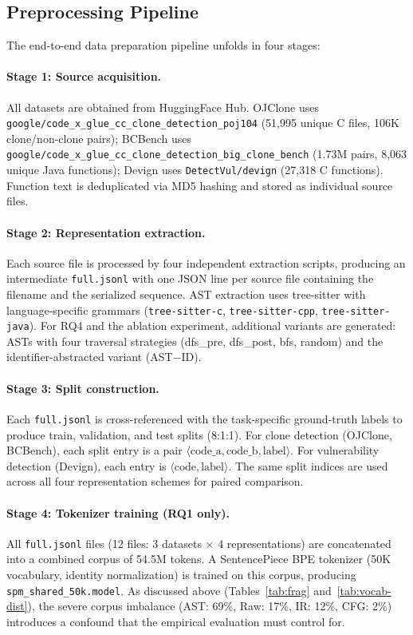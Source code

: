 \documentclass[pdflatex,sn-mathphys,Numbered]{sn-jnl}
\begin{document}
\subsection{Preprocessing Pipeline}

The end-to-end data preparation pipeline unfolds in four stages:

\paragraph{Stage 1: Source acquisition.} All datasets are obtained from HuggingFace Hub. OJClone uses \texttt{google/code\_x\_glue\_cc\_clone\_detection\_poj104} (51,995 unique C files, 106K clone/non-clone pairs); BCBench uses \texttt{google/code\_x\_glue\_cc\_clone\_detection\_big\_clone\_bench} (1.73M pairs, 8,063 unique Java functions); Devign uses \texttt{DetectVul/devign} (27,318 C functions). Function text is deduplicated via MD5 hashing and stored as individual source files.

\paragraph{Stage 2: Representation extraction.} Each source file is processed by four independent extraction scripts, producing an intermediate \texttt{full.jsonl} with one JSON line per source file containing the filename and the serialized sequence. AST extraction uses tree-sitter with language-specific grammars (\texttt{tree-sitter-c}, \texttt{tree-sitter-cpp}, \texttt{tree-sitter-java}). For RQ4 and the ablation experiment, additional variants are generated: ASTs with four traversal strategies (dfs\_pre, dfs\_post, bfs, random) and the identifier-abstracted variant (AST$-$ID).

\paragraph{Stage 3: Split construction.} Each \texttt{full.jsonl} is cross-referenced with the task-specific ground-truth labels to produce train, validation, and test splits (8:1:1). For clone detection (OJClone, BCBench), each split entry is a pair $\langle\text{code\_a}, \text{code\_b}, \text{label}\rangle$. For vulnerability detection (Devign), each entry is $\langle\text{code}, \text{label}\rangle$. The same split indices are used across all four representation schemes for paired comparison.

\paragraph{Stage 4: Tokenizer training (RQ1 only).} All \texttt{full.jsonl} files (12 files: 3 datasets $\times$ 4 representations) are concatenated into a combined corpus of 54.5M tokens. A SentencePiece BPE tokenizer (50K vocabulary, identity normalization) is trained on this corpus, producing \texttt{spm\_shared\_50k.model}. As discussed above (Tables~\ref{tab:frag} and~\ref{tab:vocab-dist}), the severe corpus imbalance (AST: 69\%, Raw: 17\%, IR: 12\%, CFG: 2\%) introduces a confound that the empirical evaluation must control for.
\end{document}

